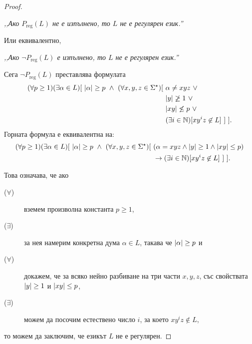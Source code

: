 \begin{proof}
  \begin{center}
    {\em ,,Ако $P_{\text{reg}}(L)$ не е изпълнено, то $L$ не е регулярен език.''}
  \end{center}
  Или еквивалентно,
  \begin{center}
    {\em ,,Ако $\neg P_{\text{reg}}(L)$ е изпълнено, то $L$ не е регулярен език.''}
  \end{center}
  Сега $\neg P_{\text{reg}}(L)$ преставлява формулата
  \begin{align*}
    (\forall p \geq 1)(\exists \alpha \in L)[\ \abs{\alpha} \geq p\ \land\ (\forall x,y,z\in\Sigma^\star)[\ & \alpha \neq xyz\ \lor\\
                                                                                                            & \abs{y} \not\geq 1\ \lor\\
                                                                                                            & \abs{xy} \not\leq p\ \lor\\
                                                                                                            & (\exists i\in\Nat)[xy^iz \not\in L]\ ]\ ].
  \end{align*}
  Горната формула е еквивалентна на:
  \begin{align*}
    (\forall p \geq 1)(\exists \alpha \in L)[\ \abs{\alpha} \geq p\ \land\ (\forall x,y,z\in\Sigma^\star)[\ & (\alpha = xyz \wedge \abs{y} \geq 1\wedge \abs{xy} \leq p)\\
                                                                                                            & \to (\exists i\in\Nat)[xy^iz \not\in L]\ ]\ ].
  \end{align*}

  Това означава, че ако
  \begin{description}
  \item[($\forall$)]
    вземем произволна константа $p \geq 1$,
  \item[($\exists$)]
    за нея намерим конкретна дума $\alpha \in L$, такава че $\lvert{\alpha}\rvert \geq p$ и 
  \item[($\forall$)]
    докажем, че за всяко нейно разбиване на три части $x,y,z$, със свойствата
    $\lvert{y}\rvert \geq 1$ и $\lvert{xy}\rvert \leq p$,
  \item[($\exists$)]
    можем да посочим естествено число $i$, за което $xy^iz \not\in L$,
  \end{description}
  то можем да заключим, че езикът $L$ не е регулярен.
\end{proof}

